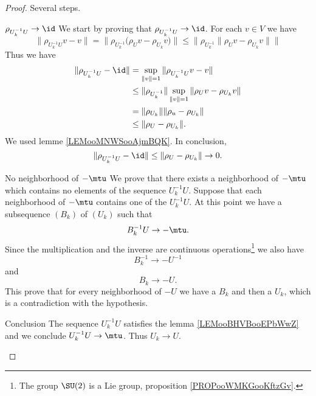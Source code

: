 \begin{proof}
    Several steps.
        \begin{subproof}
        \item[\( \rho_{U_k^{-1}U}\to\id\)]
                We start by proving that \( \rho_{U_k^{-1} U}\to \id\). For each \( v\in V\) we have
                \begin{equation}
                    \| \rho_{U_k^{-1} U}v-v \|=\| \rho_{U_k^{-1}}\big( \rho_Uv-\rho_{U_k}v \big) \|\leq \| \rho_{U_k^{-1}}\| \rho_Uv-\rho_{U_k}v \| \|
                \end{equation}
                Thus we have
                \begin{subequations}
                    \begin{align}
                        \| \rho_{U_k^{-1}U}-\id \|&=\sup_{\| v \|=1}\| \rho_{U_k^{-1}U}v-v \|\\
                        &\leq \| \rho_{U_k^{-1}} \|\sup_{\| v \|=1}\| \rho_Uv-\rho_{U_k}v \|\\
                        &=\| \rho_{U_k} \|\| \rho_u-\rho_{U_k} \|\\
                        &\leq \| \rho_U-\rho_{U_k} \|.
                    \end{align}
                \end{subequations}
                We used lemme \ref{LEMooMNWSooAjmBQK}. In conclusion,
                \begin{equation}
                    \| \rho_{U_k^{-1}U}-\id \|\leq \| \rho_U-\rho_{U_k} \|\to 0.
                \end{equation}
            \item[No neighborhood of \( -\mtu\)]   
                We prove that there exists a neighborhood of \( -\mtu\) which contains no elements of the sequence \( U_k^{-1}U\). Suppose that each neighborhood of \( -\mtu\) contains one of the \( U_k^{-1}U\). At this point we have a subsequence \( (B_k)\) of \( (U_k)\) such that 
                \begin{equation}
                    B_k^{-1}U\to-\mtu. 
                \end{equation}
                Since the multiplication and the inverse are continuous operations\footnote{The group \( \SU(2)\) is a Lie group, proposition \ref{PROPooWMKGooKftzGv}.} we also have 
                \begin{equation}
                    B_k^{-1}\to-U^{-1}
                \end{equation}
                and
                \begin{equation}
                    B_k\to -U.
                \end{equation}
                This prove that for every neighborhood of \( -U\) we have a \( B_k\) and then a \( U_k\), which is a contradiction with the hypothesis.
            \item[Conclusion] 
                The sequence \( U_k^{-1}U\) satisfies the lemma \ref{LEMooBHVBooEPbWwZ} and we conclude \( U_k^{-1}U\to \mtu\). Thus \( U_k\to U\).
        \end{subproof}
\end{proof}

